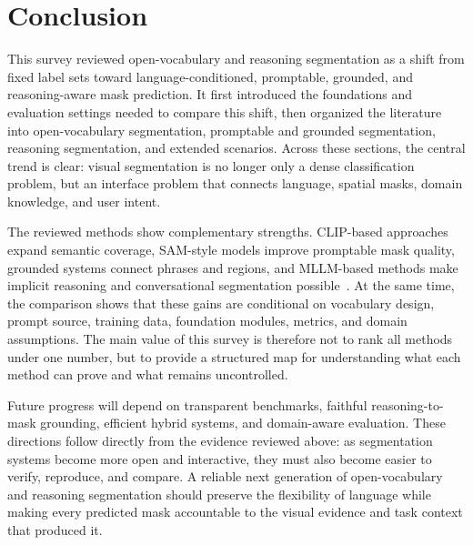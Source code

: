 \section{Conclusion}

This survey reviewed open-vocabulary and reasoning segmentation as a shift from fixed label sets toward language-conditioned, promptable, grounded, and reasoning-aware mask prediction. It first introduced the foundations and evaluation settings needed to compare this shift, then organized the literature into open-vocabulary segmentation, promptable and grounded segmentation, reasoning segmentation, and extended scenarios. Across these sections, the central trend is clear: visual segmentation is no longer only a dense classification problem, but an interface problem that connects language, spatial masks, domain knowledge, and user intent.

The reviewed methods show complementary strengths. CLIP-based approaches expand semantic coverage, SAM-style models improve promptable mask quality, grounded systems connect phrases and regions, and MLLM-based methods make implicit reasoning and conversational segmentation possible~\citep{radford2021learning,kirillov2023sam,ravi2024sam2,liang2023ovseg,xu2023san,xlaiLisaReasoningSegmentation2024,renPixellmPixelReasoning2024}. At the same time, the comparison shows that these gains are conditional on vocabulary design, prompt source, training data, foundation modules, metrics, and domain assumptions. The main value of this survey is therefore not to rank all methods under one number, but to provide a structured map for understanding what each method can prove and what remains uncontrolled.

Future progress will depend on transparent benchmarks, faithful reasoning-to-mask grounding, efficient hybrid systems, and domain-aware evaluation. These directions follow directly from the evidence reviewed above: as segmentation systems become more open and interactive, they must also become easier to verify, reproduce, and compare. A reliable next generation of open-vocabulary and reasoning segmentation should preserve the flexibility of language while making every predicted mask accountable to the visual evidence and task context that produced it.
